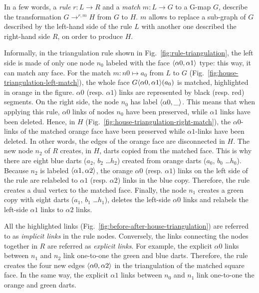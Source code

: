 In a few words, a \emph{rule} $r : L \longrightarrow R$ and a \emph{match} $m : L \to G$ to a G-map $G$, describe the transformation $G \longrightarrow^{r,m} H$ from $G$ to $H$.
$m$ allows to replace a sub-graph of $G$ described by the left-hand side of the rule $L$ with another one described the right-hand side $R$, on order to produce $H$.

Informally, in the triangulation rule shown in Fig.~\ref{fig:rule-triangulation}, the left side is made of only one node $n_{0}$ labeled with the face $\langle\alpha 0, \alpha 1\rangle$ type: this way, it can match any face.
For the match $m : n0 \mapsto a_{0}$ from $L$ to $G$ (Fig.~\ref{fig:house-triangulation-left-match}), the whole face $G\langle\alpha 0, \alpha 1\rangle(a_{0})$ is matched, highlighted in orange in the figure. $\alpha 0$ (resp. $\alpha 1$) links are represented by black (resp. red) segments.
On the right side, the node $n_{0}$ has label $\langle\alpha 0, \_\rangle$.
This means that when applying this rule, $\alpha 0$ links of nodes $n_{0}$ have been preserved, while $\alpha 1$ links have been deleted.
Hence, in $H$ (Fig.~\ref{fig:house-triangulation-right-match}), the $\alpha 0$-links of the matched orange face have been preserved while $\alpha 1$-links have been deleted.
In other words, the edges of the orange face are disconnected in $H$.
The new node $n_{2}$ of $R$ creates, in $H$, darts copied from the matched face.
This is why there are eight blue darts ($a_2$, $b_2$ \dots $h_2$) created from orange darts ($a_0$, $b_0$ \dots $h_0$).
Because $n_{2}$ is labeled $\langle\alpha 1, \alpha 2\rangle$, the  orange $\alpha 0$ (resp. $\alpha 1$) links on the left side of the rule are relabeled to $\alpha 1$ (resp. $\alpha 2$) links in the blue copy.
Therefore, the rule creates a dual vertex to the matched face.
Finally, the node $n_{1}$ creates a green copy with eight darts ($a_1$, $b_1$ \dots $h_1$), deletes the left-side $\alpha 0$ links and relabels the left-side $\alpha 1$ links to $\alpha 2$ links.

All the highlighted links (Fig.~\ref{fig:before-after-house-triangulation}) are referred to as \emph{implicit links} in the rule nodes.
Conversely, the links connecting the nodes together in $R$ are referred as \emph{explicit links}.
For example, the explicit $\alpha 0$ links between $n_1$ and $n_2$ link one-to-one the green and blue darts.
Therefore, the rule creates the four new edges $\langle\alpha 0, \alpha 2\rangle$ in the triangulation of the matched square face.
In the same way, the explicit $\alpha 1$ links between $n_0$ and $n_1$ link one-to-one the orange and green darts.

